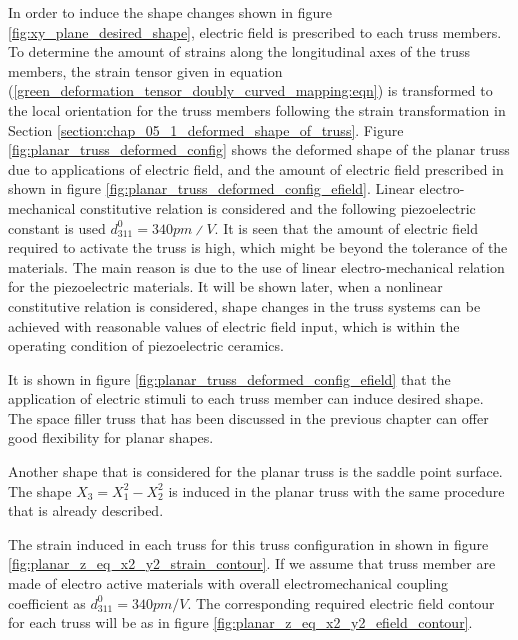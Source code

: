 In order to induce the shape changes shown in figure \ref{fig:xy_plane_desired_shape}, electric field is prescribed to each truss members. To determine the amount of strains along the longitudinal axes of the truss members, the strain tensor given in equation (\ref{green_deformation_tensor_doubly_curved_mapping:eqn}) is transformed to the local orientation for the truss members following the strain transformation in Section \ref{section:chap_05_1_deformed_shape_of_truss}. Figure \ref{fig:planar_truss_deformed_config} shows the deformed shape of the planar truss due to applications of electric field, and the amount of electric field prescribed in shown in figure \ref{fig:planar_truss_deformed_config_efield}. Linear electro-mechanical constitutive relation is considered and the following piezoelectric constant is used $d_{311}^0 = 340pm∕V$. It is seen that the amount of electric field required to activate the truss is high, which might be beyond the tolerance of the materials. The main reason is due to the use of linear electro-mechanical relation for the piezoelectric materials. It will be shown later, when a nonlinear constitutive relation is considered, shape changes in the truss systems can be achieved with reasonable values of electric field input, which is within the operating condition of piezoelectric ceramics. 

It is shown in figure \ref{fig:planar_truss_deformed_config_efield} that the application of electric stimuli to each truss member can induce desired shape. The space filler truss that has been discussed in the previous chapter can offer good flexibility for planar shapes. 

Another shape that is considered for the planar truss is the saddle point surface. The shape $X_3=X_1^2-X_2^2$ is induced in the planar truss with the same procedure that is already described. 



The strain induced in each truss for this truss configuration in shown in figure \ref{fig:planar_z_eq_x2_y2_strain_contour}.  If we assume that truss member are made of electro active materials with overall electromechanical coupling coefficient as $d_{311}^0=340pm/V$. The corresponding required electric field contour for each truss will be as in figure \ref{fig:planar_z_eq_x2_y2_efield_contour}. 


